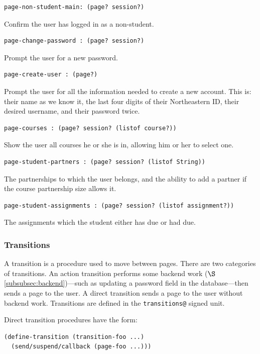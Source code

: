 \documentclass[a4paper]{article}
\begin{document}
\begin{verbatim}
page-non-student-main: (page? session?)
\end{verbatim}
Confirm the user has logged in as a non-student.

\begin{verbatim}
page-change-password : (page? session?)
\end{verbatim}
Prompt the user for a new password.

\begin{verbatim}
page-create-user : (page?)
\end{verbatim}
Prompt the user for all the information needed to create a
new account. This is: their name as we know it, the last
four digits of their Northeastern ID, their desired username,
and their password twice.

\begin{verbatim}
page-courses : (page? session? (listof course?))
\end{verbatim}
Show the user all courses he or she is in, allowing him or her to select one.

\begin{verbatim}
page-student-partners : (page? session? (listof String))
\end{verbatim}
The partnerships to which the user belongs, and the ability to add a partner if
the course partnership size allows it.

\begin{verbatim}
page-student-assignments : (page? session? (listof assignment?))
\end{verbatim}
The assignments which the student either has due or had due.

\subsubsection{Transitions}\label{subsubsec:transitions}

A transition is a procedure used to move between pages. There are two categories
of transitions. An action transition performs some backend work
($\S$\ref{subsubsec:backend})---such as updating a password field in the
database---then sends a page to the user. A direct transition sends a page to
the user without backend work. Transitions are defined in the
\verb|transitions@| signed unit.

Direct transition procedures have the form:

\begin{verbatim}
(define-transition (transition-foo ...)
  (send/suspend/callback (page-foo ...)))
\end{verbatim}
\end{document}

